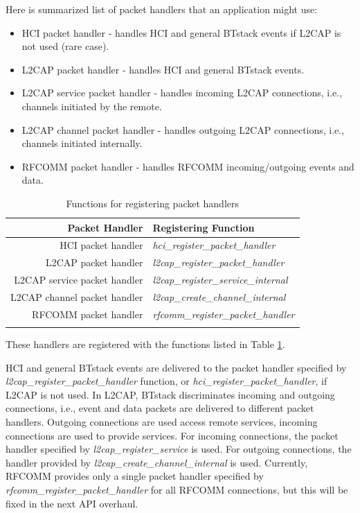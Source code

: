 \documentclass[a4paper,titlepage,oneside,12pt]{amsart} %
\begin{document}
Here is summarized list of packet handlers that an application might use:
\begin{itemize}
\item HCI packet handler - handles HCI and general BTstack events if L2CAP is not used (rare case). 
\item L2CAP packet handler - handles HCI and general BTstack events.
\item L2CAP service packet handler - handles incoming L2CAP connections, i.e., channels initiated by the remote.
\item L2CAP channel packet handler - handles outgoing L2CAP connections,  i.e., channels initiated internally.
\item RFCOMM packet handler - handles RFCOMM  incoming/outgoing events and data.
\end{itemize}

\begin{table}\centering
\caption{Functions for registering packet handlers}
\begin{tabular}{rl}\toprule
Packet Handler & Registering Function\\ 
\midrule
HCI packet handler &  \emph{hci\_register\_packet\_handler}\\
L2CAP packet handler &  \emph{l2cap\_register\_packet\_handler}\\
L2CAP service packet handler & \emph{l2cap\_register\_service\_internal}\\
L2CAP channel packet handler & \emph{l2cap\_create\_channel\_internal}\\
RFCOMM packet handler & \emph{rfcomm\_register\_packet\_handler}\\
\bottomrule
 \label{table:registeringFunction}
 \end{tabular}
\end{table}

These handlers are registered with the functions listed in Table \ref{table:registeringFunction}. 

HCI and general BTstack events are delivered to the packet handler specified by \emph{l2cap\_register\_packet\_handler} function, or \emph{hci\_register\_packet\_handler}, if L2CAP is not used. In L2CAP, BTstack discriminates incoming and outgoing connections, i.e., event and data packets are delivered to different packet handlers. Outgoing connections are used access remote services, incoming connections are used to provide services. For incoming connections, the packet handler specified by \emph{l2cap\_register\_service} is used. For outgoing connections, the handler provided by \emph{l2cap\_create\_channel\_internal} is used.
Currently, RFCOMM provides only a single packet handler specified by \emph{rfcomm\_register\_packet\_handler} for all RFCOMM connections, but this will be fixed in the next API overhaul.
 
\end{document}
